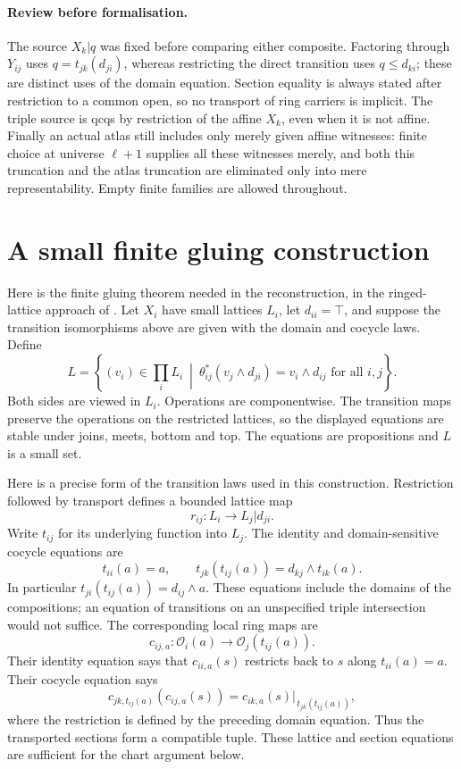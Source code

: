 \documentclass[11pt]{amsart}
\theoremstyle{definition}\newtheorem{definition}[theorem]{Definition}
\theoremstyle{remark}\newtheorem{remark}[theorem]{Remark}
\begin{document}
\paragraph{Review before formalisation.}
The source $X_k|q$ was fixed before comparing either composite.
Factoring through $Y_{ij}$ uses $q=t_{jk}(d_{ji})$, whereas restricting
the direct transition uses $q\leq d_{ki}$; these are distinct uses of
the domain equation. Section equality is always stated after restriction
to a common open, so no transport of ring carriers is implicit. The
triple source is qcqs by restriction of the affine $X_k$, even when it
is not affine. Finally an actual atlas still includes only merely given
affine witnesses: finite choice at universe $\ell+1$ supplies all these
witnesses merely, and both this truncation and the atlas truncation are
eliminated only into mere representability. Empty finite families are
allowed throughout.

\section{A small finite gluing construction}
Here is the finite gluing theorem needed in the reconstruction, in the
ringed-lattice approach of \cite{CLS}. Let
$X_i$ have small lattices $L_i$, let $d_{ii}=\top$, and suppose the
transition isomorphisms above are given with the domain and cocycle
laws. Define
\[
 L=\left\{(v_i)\in\prod_i L_i\ \middle|\
   \theta_{ij}^*(v_j\wedge d_{ji})=v_i\wedge d_{ij}
   \text{ for all }i,j\right\}.
\]
Both sides are viewed in $L_i$. Operations are componentwise. The
transition maps preserve the operations on the restricted lattices,
so the displayed equations are stable under joins, meets, bottom and
top. The equations are propositions and $L$ is a small set.

Here is a precise form of the transition laws used in this construction.
Restriction followed by transport defines a bounded lattice map
\[
 r_{ij}:L_i\longrightarrow L_j|d_{ji}.
\]
Write $t_{ij}$ for its underlying function into $L_j$. The identity and
domain-sensitive cocycle equations are
\[
 t_{ii}(a)=a,\qquad
 t_{jk}(t_{ij}(a))=d_{kj}\wedge t_{ik}(a).
\]
In particular $t_{ji}(t_{ij}(a))=d_{ij}\wedge a$.
These equations include the domains of the compositions; an equation of
transitions on an unspecified triple intersection would not suffice.
The corresponding local ring maps are
\[
 c_{ij,a}:\mathcal O_i(a)\longrightarrow
               \mathcal O_j(t_{ij}(a)).
\]
Their identity equation says that $c_{ii,a}(s)$ restricts back to $s$
along $t_{ii}(a)=a$. Their cocycle equation says
\[
 c_{jk,t_{ij}(a)}(c_{ij,a}(s))
   =c_{ik,a}(s)|_{\,t_{jk}(t_{ij}(a))},
\]
where the restriction is defined by the preceding domain equation.
Thus the transported sections form a compatible tuple. These lattice
and section equations are sufficient for the chart argument below.
\end{document}

